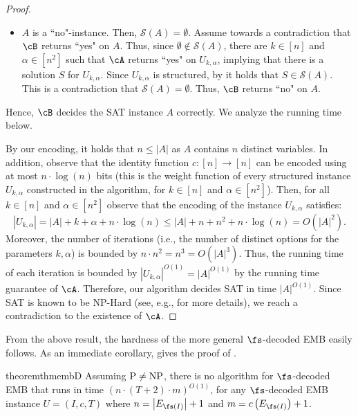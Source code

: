 \begin{proof}
\begin{itemize}
		\item $A$ is a ``no"-instance. Then, $\mathcal{S}(A) = \emptyset$. %
		Assume towards a contradiction that $\cB$ returns ``yes" on $A$. Thus, since $\emptyset \notin \mathcal{S}(A)$, there are $k \in [n]$ and $\alpha \in \left[ n^2\right]$ such that $\cA$ returns ``yes" on $U_{k,\alpha}$, implying that there is a solution $S$ for $U_{k,\alpha}$. Since $U_{k,\alpha}$ is structured, by  it holds that $S \in \mathcal{S}(A)$. 
		This is a contradiction that $\mathcal{S}(A) = \emptyset$. Thus, $\cB$ returns ``no" on $A$. 
	\end{itemize} 
	Hence, $\cB$ decides the SAT instance $A$ correctly. We analyze the running time below.  
	
	 By our encoding, it holds that $n \leq |A|$ as $A$ contains $n$ distinct variables. In addition, observe that the identity function $c:[n] \rightarrow [n]$ can be encoded using at most $n \cdot \log (n)$ bits (this is the weight function of every structured instance $U_{k,\alpha}$ constructed in the algorithm, for $k \in [n]$ and $\alpha \in \left[n^2\right]$). Then, for all $k \in [n]$ and $\alpha \in \left[ n^2\right]$ observe that the encoding of the instance $U_{k,\alpha}$ satisfies: $$|U_{k,\alpha}| = |A|+k+\alpha+n \cdot \log (n) \leq |A|+n+n^2 +n \cdot \log (n)= O\left(|A|^2\right).$$ %
	 Moreover, the number of iterations (i.e., the number of distinct options for the parameters $k,\alpha$) is bounded by $n \cdot n^2 = n^3 = O(|A|^3)$. Thus, the running time of each iteration is bounded by $|U_{k,\alpha}|^{O(1)} = |A|^{O(1)}$ by the running time guarantee of $\cA$. Therefore, our algorithm decides SAT in time $|A|^{O(1)}$. Since SAT is known to be NP-Hard (see, e.g., \cite{garey1997computers} for more details), we reach a contradiction to the existence of $\cA$. %
\end{proof}

From the above result, the hardness of the more general $\fs$-decoded EMB easily follows. As an immediate corollary,  gives the proof of . 

	\begin{restatable}{theorem}{thmembD}
	\label{thm:embD}
	Assuming $\textnormal{P} \neq \textnormal{NP}$, there is no algorithm  for $\fs$-decoded \textnormal{EMB} that runs in time $ (n \cdot(T+2) \cdot m)^{O(1)}$, for any  $\fs$-decoded \textnormal{EMB} instance $U =(I,c,T)$ where $n = \left|E_{\fs(I)}\right|+1$ and $m = c\left(E_{\fs(I)}\right) +1$. 
\end{restatable}

